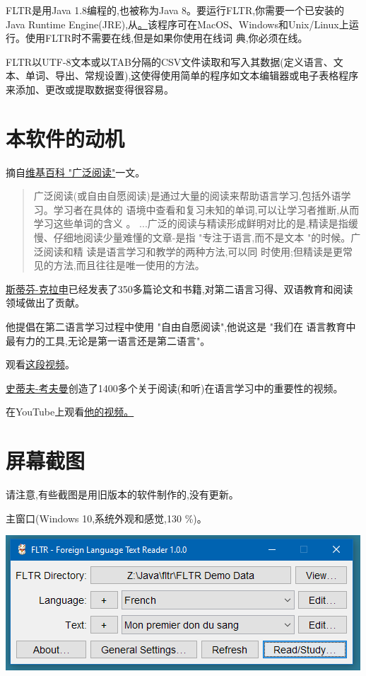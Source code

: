 \documentclass[cn,10pt,math=newtx,citestyle=gb7714-2015,bibstyle=gb7714-2015]{elegantbook}
\begin{document}
FLTR是用Java 1.8编程的,也被称为Java 8。要运行FLTR,你需要一个已安装的Java Runtime Engine(JRE),从\href{http://java.com}。该程序可在MacOS、Windows和Unix/Linux上运行。使用FLTR时不需要在线,但是如果你使用在线词 典,你必须在线。


FLTR以UTF-8文本或以TAB分隔的CSV文件读取和写入其数据(定义语言、文本、单词、导出、常规设置),这使得使用简单的程序如文本编辑器或电子表格程序来添加、更改或提取数据变得很容易。
\chapter{本软件的动机}
摘自\href{http://en.wikipedia.org/wiki/Extensive_reading}{维基百科 "广泛阅读"}一文。
\begin{quotation}

广泛阅读(或自由自愿阅读)是通过大量的阅读来帮助语言学习,包括外语学习。学习者在具体的 语境中查看和复习未知的单词,可以让学习者推断,从而学习这些单词的含义 。 ...广泛的阅读与精读形成鲜明对比的是,精读是指缓慢、仔细地阅读少量难懂的文章-是指 "专注于语言,而不是文本 "的时候。广泛阅读和精 读是语言学习和教学的两种方法,可以同 时使用;但精读是更常见的方法,而且往往是唯一使用的方法。
\end{quotation}
\href{https://zh.wikipedia.org/zh-hans/史蒂芬·克拉申}{斯蒂芬-克拉申}已经发表了350多篇论文和书籍,对第二语言习得、双语教育和阅读领域做出了贡献。


他提倡在第二语言学习过程中使用 "自由自愿阅读",他说这是 "我们在 语言教育中最有力的工具,无论是第一语言还是第二语言"。


观看\href{http://www.youtube.com/watch?v=NiTsduRreug}{这段视频}。


\href{https://blog.thelinguist.com/}{史蒂夫-考夫曼}创造了1400多个关于阅读(和听)在语言学习中的重要性的视频。

在YouTube上观看\href{https://www.youtube.com/user/lingosteve/videos?sort=p&flow=grid&view=0}{他的视频。}
\chapter{屏幕截图}

请注意,有些截图是用旧版本的软件制作的,没有更新。


主窗口(Windows 10,系统外观和感觉,130 \%)。

\includegraphics[scale=0.8]{image/images-006.png}
\end{document}
